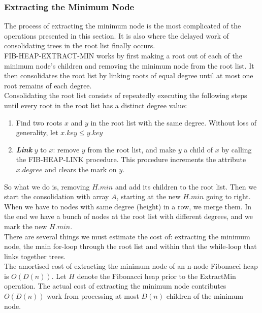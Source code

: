 \documentclass[12pt]{article}
\begin{document}
\subsubsection{Extracting the Minimum Node}
The process of extracting the minimum node is the most complicated of the operations presented in this section. It is also where the delayed work of consolidating trees in the root list finally occurs. \\

FIB-HEAP-EXTRACT-MIN works by first making a root out of each of the minimum node’s children and removing the minimum node from the root list. It then consolidates the root list by linking roots of equal degree until at most one root remains of each degree.\\

Consolidating the root list consists of repeatedly executing the following steps until every root in the root list has a distinct degree value:
\begin{enumerate}
	\item Find two roots $x$ and $y$ in the root list with the same degree. Without loss of generality, let $x.key \leq y.key$
	\item \textbf{\textit{Link}} $y$ to $x$: remove $y$ from the root list, and make $y$ a child of $x$ by calling the FIB-HEAP-LINK procedure. This procedure increments the attribute $x.degree$ and clears the mark on $y$. 
\end{enumerate}

So what we do is, removing $H.min$ and add its children to the root list. Then we start the consolidation with array $A$, starting at the new $H.min$ going to right. When we have to nodes with same degree (height) in a row, we merge them. In the end we have a bunch of nodes at the root list with different degrees, and we mark the new $H.min$. \\

There are several things we must estimate the cost of: extracting the minimum node, the main for-loop through the root list and within that the while-loop that links together trees.\\

The amortised cost of extracting the minimum node of an n-node Fibonacci heap is $O(D(n))$. Let $H$ denote the Fibonacci heap prior to the ExtractMin operation. The actual cost of extracting the minimum node contributes $O(D(n))$ work from processing at most $D(n)$ children of the minimum node.\\
\end{document}

